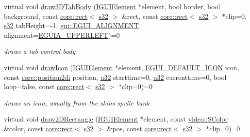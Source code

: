 \begin{DoxyCompactItemize}
virtual void \hyperlink{classirr_1_1gui_1_1IGUISkin_aeacbaa90b32b9665100320520d1d983f}{draw3\+D\+Tab\+Body} (\hyperlink{classirr_1_1gui_1_1IGUIElement}{I\+G\+U\+I\+Element} $\ast$element, bool border, bool background, const \hyperlink{classirr_1_1core_1_1rect}{core\+::rect}$<$ \hyperlink{namespaceirr_ac66849b7a6ed16e30ebede579f9b47c6}{s32} $>$ \&rect, const \hyperlink{classirr_1_1core_1_1rect}{core\+::rect}$<$ \hyperlink{namespaceirr_ac66849b7a6ed16e30ebede579f9b47c6}{s32} $>$ $\ast$clip=0, \hyperlink{namespaceirr_ac66849b7a6ed16e30ebede579f9b47c6}{s32} tab\+Height=-\/1, \hyperlink{namespaceirr_1_1gui_a19eb5fb40e67f108cb16aba922ddaa2d}{gui\+::\+E\+G\+U\+I\+\_\+\+A\+L\+I\+G\+N\+M\+E\+NT} alignment=\hyperlink{namespaceirr_1_1gui_a19eb5fb40e67f108cb16aba922ddaa2da29a8bc6d2531cca02458ca8809aa2b75}{E\+G\+U\+I\+A\+\_\+\+U\+P\+P\+E\+R\+L\+E\+FT})=0
\begin{DoxyCompactList}\small\item\em draws a tab control body \end{DoxyCompactList}\item 
virtual void \hyperlink{classirr_1_1gui_1_1IGUISkin_a121399252e149f6977eb6cc706dd5867}{draw\+Icon} (\hyperlink{classirr_1_1gui_1_1IGUIElement}{I\+G\+U\+I\+Element} $\ast$element, \hyperlink{namespaceirr_1_1gui_a8e54aa253459daf0b62670bda4556d9f}{E\+G\+U\+I\+\_\+\+D\+E\+F\+A\+U\+L\+T\+\_\+\+I\+C\+ON} icon, const \hyperlink{namespaceirr_1_1core_ace0f1379db5f9f5660456ec57ab78202}{core\+::position2di} position, \hyperlink{namespaceirr_a0416a53257075833e7002efd0a18e804}{u32} starttime=0, \hyperlink{namespaceirr_a0416a53257075833e7002efd0a18e804}{u32} currenttime=0, bool loop=false, const \hyperlink{classirr_1_1core_1_1rect}{core\+::rect}$<$ \hyperlink{namespaceirr_ac66849b7a6ed16e30ebede579f9b47c6}{s32} $>$ $\ast$clip=0)=0
\begin{DoxyCompactList}\small\item\em draws an icon, usually from the skin\textquotesingle{}s sprite bank \end{DoxyCompactList}\item 
virtual void \hyperlink{classirr_1_1gui_1_1IGUISkin_a137082ed352db8dcb713449dfba0ff3e}{draw2\+D\+Rectangle} (\hyperlink{classirr_1_1gui_1_1IGUIElement}{I\+G\+U\+I\+Element} $\ast$element, const \hyperlink{classirr_1_1video_1_1SColor}{video\+::\+S\+Color} \&color, const \hyperlink{classirr_1_1core_1_1rect}{core\+::rect}$<$ \hyperlink{namespaceirr_ac66849b7a6ed16e30ebede579f9b47c6}{s32} $>$ \&pos, const \hyperlink{classirr_1_1core_1_1rect}{core\+::rect}$<$ \hyperlink{namespaceirr_ac66849b7a6ed16e30ebede579f9b47c6}{s32} $>$ $\ast$clip=0)=0

\end{DoxyCompactItemize}
